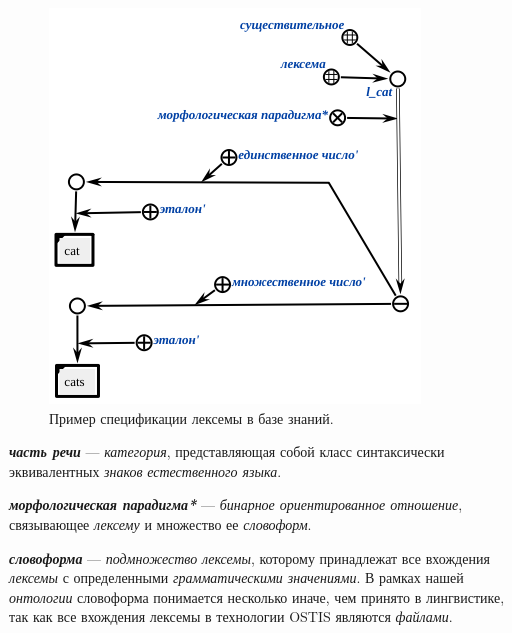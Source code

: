 \begin{figure}[h]
    \centering
    \includegraphics[scale=0.8]{images/part2/chapter_lang/lexeme_example}
    \caption{Пример спецификации лексемы в базе знаний.}
    \label{fig:lexeme_example}
\end{figure}

\textbf{\textit{часть речи}} --- \textit{категория}, представляющая собой класс синтаксически эквивалентных \textit{знаков} \textit{естественного языка}.

\begin{SCn}


\end{SCn}

\textbf{\textit{морфологическая парадигма*}} --- \textit{бинарное ориентированное отношение}, связывающее \textit{лексему} и множество ее \textit{словоформ}.

\textbf{\textit{словоформа}} --- \textit{подмножество} \textit{лексемы}, которому принадлежат все вхождения \textit{лексемы} с определенными \textit{грамматическими значениями}.
В рамках нашей \textit{онтологии} словоформа понимается несколько иначе, чем принято в лингвистике, так как все вхождения лексемы в технологии OSTIS являются \textit{файлами}.

